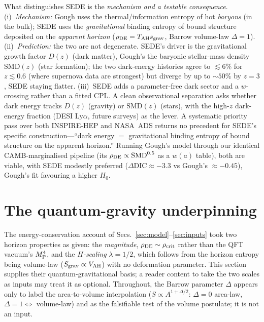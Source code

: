 What distinguishes SEDE is the \emph{mechanism and a testable consequence}. (i)~\emph{Mechanism:} Gough
uses the thermal/information entropy of hot \emph{baryons} (in the bulk); SEDE uses the
\emph{gravitational} binding entropy of bound structure deposited on the \emph{apparent horizon}
($\rho_{\mathrm{DE}}=T_{\mathrm{AH}}s_{\mathrm{grav}}$, Barrow volume-law $\Delta=1$). (ii)~\emph{Prediction:} the two are not
degenerate. SEDE's driver is the gravitational growth factor $D(z)$ (dark matter), Gough's the baryonic
stellar-mass density $\mathrm{SMD}(z)$ (star formation); the two dark-energy histories agree to
$\lesssim6\%$ for $z\lesssim0.6$ (where supernova data are strongest) but diverge by up to $\sim50\%$ by
$z=3$, SEDE staying flatter. (iii)~SEDE adds a parameter-free dark sector and a $w$-crossing rather than
a fitted CPL. A clean observational separation asks whether dark energy tracks $D(z)$ (gravity) or
$\mathrm{SMD}(z)$ (stars), with the high-$z$ dark-energy fraction (DESI Ly$\alpha$, future surveys) as
the lever. A systematic priority pass over both INSPIRE-HEP and NASA~ADS returns no precedent for SEDE's
specific construction---``dark energy $=$ gravitational binding entropy of bound structure on the
apparent horizon.'' Running Gough's model through our identical CAMB-marginalised pipeline (its
$\rho_{\mathrm{DE}}\propto\mathrm{SMD}^{0.5}$ as a $w(a)$ table), both are viable, with SEDE modestly preferred
($\Delta\mathrm{DIC}\approx-3.3$ vs Gough's $\approx-0.45$), Gough's fit favouring a higher $H_0$.
\section{The quantum-gravity underpinning}\label{sec:qg}
The energy-conservation account of Secs.~\ref{sec:model}--\ref{sec:inputs} took two horizon properties
as given: the \emph{magnitude}, $\rho_{\mathrm{DE}}\sim\rho_{\mathrm{crit}}$ rather than the QFT vacuum's $M_{\mathrm P}^4$, and the
\emph{$H$-scaling} $\lambda=1/2$, which follows from the horizon entropy being volume-law
($S_{\rm grav}\propto V_{\mathrm{AH}}$) with no deformation parameter. This section supplies their
quantum-gravitational basis; a reader content to take the two scales as inputs may treat it as optional.
Throughout, the Barrow parameter $\Delta$ appears only to label the area-to-volume interpolation
($S\propto A^{1+\Delta/2}$: $\Delta=0$ area-law, $\Delta=1\Leftrightarrow$ volume-law) and as the
falsifiable test of the volume postulate; it is not an input.

